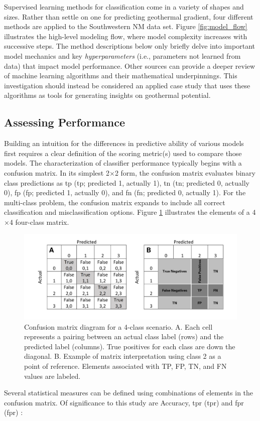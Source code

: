 Supervised learning methods for classification come in a variety of shapes and sizes. Rather than settle on one for predicting geothermal gradient, four different methods are applied to the Southwestern NM data set. Figure \ref{fig:model_flow} illustrates the high-level modeling flow, where model complexity increases with successive steps. The method descriptions below only briefly delve into important model mechanics and key \textit{hyperparameters} (i.e., parameters not learned from data) that impact model performance. Other sources can provide a deeper review of machine learning algorithms and their mathematical underpinnings. This investigation should instead be considered an applied case study that uses these algorithms as tools for generating insights on geothermal potential.

\subsection{Assessing Performance}\label{ch3:modeling_assessments}
Building an intuition for the differences in predictive ability of various models first requires a clear definition of the scoring metric(s) used to compare those models. The characterization of classifier performance typically begins with a confusion matrix. In its simplest 2$\times$2 form, the confusion matrix evaluates binary class predictions as \acrlong{tp} (\acrshort{tp}; predicted 1, actually 1), \acrlong{tn} (\acrshort{tn}; predicted 0, actually 0), \acrlong{fp} (\acrshort{fp}; predicted 1, actually 0), and \acrlong{fn} (\acrshort{fn}; predicted 0, actually 1). For the multi-class problem, the confusion matrix expands to include all correct classification and misclassification options. Figure \ref{fig:confusion_matrix} illustrates the elements of a 4$\times$4 four-class matrix.

\begin{figure}[!htp]
\centering
\includegraphics[width=\textwidth]{templates/images/Figure-Confusion_Matrix.png}
\caption[Example four-class confusion matrix]{Confusion matrix diagram for a 4-class scenario. A. Each cell represents a pairing between an actual class label (rows) and the predicted label (columns). True positives for each class are down the diagonal. B. Example of matrix interpretation using class 2 as a point of reference. Elements associated with TP, FP, TN, and FN values are labeled.}
\label{fig:confusion_matrix}
\end{figure}
Several statistical measures can be defined using combinations of elements in the confusion matrix. Of significance to this study are Accuracy, \acrlong{tpr} (\acrshort{tpr}) and \acrlong{fpr} (\acrshort{fpr}) \citep{tharwat_classification_2020}:

